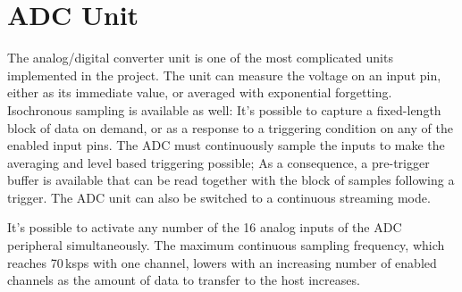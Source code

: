 \section{ADC Unit}

The analog/digital converter unit is one of the most complicated units implemented in the project. The unit can measure the voltage on an input pin, either as its immediate value, or averaged with exponential forgetting. Isochronous sampling is available as well: It's possible to capture a fixed-length block of data on demand, or as a response to a triggering condition on any of the enabled input pins. The ADC must continuously sample the inputs to make the averaging and level based triggering possible; As a consequence, a pre-trigger buffer is available that can be read together with the block of samples following a trigger. The ADC unit can also be switched to a continuous streaming mode.

It's possible to activate any number of the 16 analog inputs of the ADC peripheral simultaneously. The maximum continuous sampling frequency, which reaches 70\,ksps with one channel, lowers with an increasing number of enabled channels as the amount of data to transfer to the host increases.

